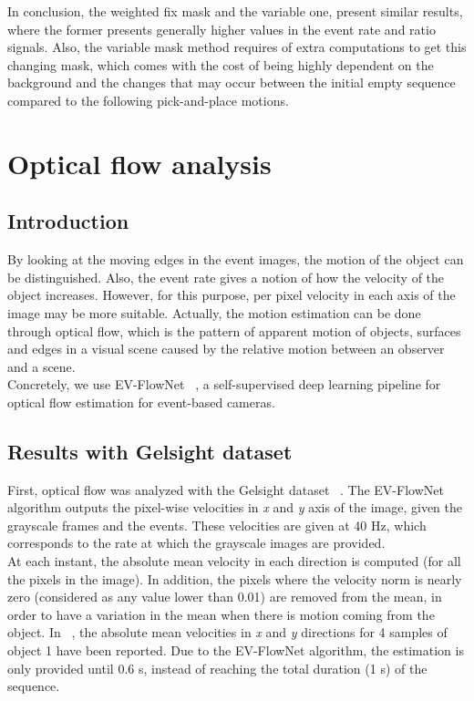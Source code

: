 In conclusion, the weighted fix mask and the variable one, present similar results, where the former presents generally higher values in the event rate and ratio signals. Also, the variable mask method requires of extra computations to get this changing mask, which comes with the cost of being highly dependent on the background and the changes that may occur between the initial empty sequence compared to the following pick-and-place motions.

\section{Optical flow analysis}

\subsection{Introduction}

By looking at the moving edges in the event images, the motion of the object can be distinguished. Also, the event rate gives a notion of how the velocity of the object increases. However, for this purpose, per pixel velocity in each axis of the image may be more suitable. Actually, the motion estimation can be done through optical flow, which is the pattern of apparent motion of objects, surfaces and edges in a visual scene caused by the relative motion between an observer and a scene.\\

Concretely, we use EV-FlowNet ~\cite{evflownet}, a self-supervised deep learning pipeline for optical flow estimation for event-based cameras. 

\subsection{Results with Gelsight dataset}

First, optical flow was analyzed with the Gelsight dataset ~\cite{gelsight2018}. The EV-FlowNet algorithm outputs the pixel-wise velocities in \textit{x} and \textit{y} axis of the image, given the grayscale frames and the events. These velocities are given at 40 Hz, which corresponds to the rate at which the grayscale images are provided.\\

At each instant, the absolute mean velocity in each direction is computed (for all the pixels in the image). In addition, the pixels where the velocity norm is nearly zero (considered as any value lower than 0.01) are removed from the mean, in order to have a variation in the mean when there is motion coming from the object. In ~, the absolute mean velocities in \textit{x} and \textit{y} directions for 4 samples of object 1 have been reported. Due to the EV-FlowNet algorithm, the estimation is only provided until 0.6 s, instead of reaching the total duration (1 s) of the sequence.\\

